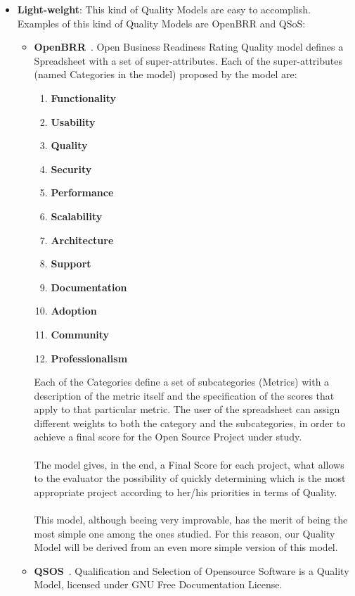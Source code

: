 \documentclass[11pt]{article}
\begin{document}
\begin{itemize}\itemsep0pt
\item{\textbf{Light-weight}}: This kind of Quality Models are easy to accomplish. Examples of this kind of Quality Models are OpenBRR and QSoS:
\begin{itemize}\itemsep0pt
\item{\textbf{OpenBRR}}~\cite{OPENBRR00}.
Open Business Readiness Rating Quality model defines a Spreadsheet with a set of super-attributes. Each of the super-attributes (named Categories in the model) proposed by the model are:
\begin{enumerate}\itemsep0pt
\item{\textbf{Functionality}}
\item{\textbf{Usability}}
\item{\textbf{Quality}}
\item{\textbf{Security}}
\item{\textbf{Performance}}
\item{\textbf{Scalability}}
\item{\textbf{Architecture}}
\item{\textbf{Support}}
\item{\textbf{Documentation}}
\item{\textbf{Adoption}}
\item{\textbf{Community}}
\item{\textbf{Professionalism}}
\end{enumerate}
Each of the Categories define a set of subcategories (Metrics) with a description of the metric itself and the specification of the scores that apply to that particular metric. The user of the spreadsheet can assign different weights to both the category and the subcategories, in order to achieve a final score for the Open Source Project under study.\\
\\
The model gives, in the end, a Final Score for each project, what allows to the evaluator the possibility of quickly determining which is the most appropriate project according to her/his priorities in terms of Quality.\\
\\
This model, although beeing very improvable, has the merit of being the most simple one among the ones studied. For this reason, our Quality Model will be derived from an even more simple version of this model.\\
\item{\textbf{QSOS}}~\cite{QSOS00}. Qualification and Selection of Opensource Software is a Quality Model, licensed under GNU Free Documentation License.\\

\end{itemize}
\end{itemize}
\end{document}

